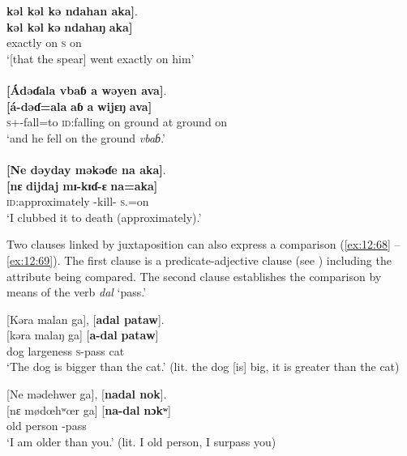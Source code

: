 \medskip
\textbf{kəl  kəl  kə  ndahan  aka]}. \\
\gll \textbf{kəl kəl} \textbf{kə}   \textbf{ndahaŋ}   \textbf{aka]} \\ 
     {exactly}    {on}    \textsc{s}          {on} \\
\glt ‘[that the spear] went exactly on him’  \\

\medskip
\clearpage
{}\\
{}\textbf{[Ádəɗala  vbaɓ  a  wəyen  ava]}.\\
\gll   \textbf{[á-dəɗ}\textbf{=ala}   \textbf{\dentalflap aɓ}  \textbf{a}  \textbf{wijɛŋ}  \textbf{ava]}\\
    \textsc{s}+{\IFV}-fall{=to}  {\textsc{id}:falling on ground}  {at}  {ground}  {on}  \\
\glt ‘and he fell on the ground \textit{vbaɓ}.’\\

\medskip
{}\\
{}\textbf{[Ne  dəyday  məkəɗe  na  aka]}.\\
\gll  \textbf{[nɛ}   \textbf{dijdaj}   \textbf{mɪ-kɪɗ-ɛ}  \textbf{na}\textbf{=aka]}\\
    {\oneS}  {\textsc{id}:approximately}     {\NOM}{}-kill-{\CL}   \textsc{s}.{\DO}{=on}\\
\glt ‘I clubbed it to death (approximately).’\\
\z  

Two clauses linked by juxtaposition can also express a comparison (\ref{ex:12:68} -- \ref{ex:12:69}). The first clause is a predicate-adjective clause (see ) including the attribute being compared. The second clause establishes the comparison by means of the verb \textit{dal} ‘pass.’

\ea \label{ex:12:68}
{}[Kəra  malan  ga],  [\textbf{adal  pataw}].\\
\gll  {}[kəra  malaŋ  ga]   [\textbf{a-dal}    \textbf{pataw}]\\
      dog    largeness  {\ADJ}      \textsc{s}-pass  cat\\
\glt  ‘The dog is bigger than the cat.’ (lit. the dog [is] big, it is greater than the cat)
\z 

\ea \label{ex:12:69}
{}[Ne  mədehwer  ga],  [\textbf{nadal  nok}].\\
\gll  {}[nɛ  mødœhʷœr  ga]    [\textbf{na-dal}  \textbf{nɔkʷ}]\\
      {\oneS}  {old person}  {\ADJ}    {\oneS}-pass  {\twoS}\\
\glt  ‘I am older than you.’ (lit. I old person, I surpass you)
\z 